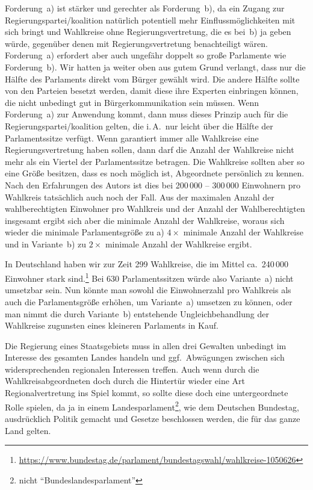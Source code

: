 Forderung~a) ist stärker und gerechter als Forderung~b), da ein Zugang zur
Regierungspartei/koalition natürlich potentiell mehr Einflussmöglichkeiten mit sich bringt und
Wahlkreise ohne Regierungsvertretung, die es bei~b) ja geben würde, gegenüber denen mit
Regierungsvertretung benachteiligt wären. Forderung~a) erfordert aber auch ungefähr doppelt so
große Parlamente wie Forderung~b).
Wir hatten ja weiter oben aus gutem Grund verlangt, dass nur die Hälfte des Parlaments direkt
vom Bürger gewählt wird. Die andere Hälfte sollte von den Parteien besetzt werden, damit diese
ihre Experten einbringen können, die nicht unbedingt gut in Bürgerkommunikation sein müssen. Wenn
Forderung~a) zur Anwendung kommt, dann muss dieses Prinzip auch für die Regierungspartei/koalition
gelten, die i.\,A.\ nur leicht über die Hälfte der Parlamentssitze verfügt. Wenn garantiert immer
alle Wahlkreise eine Regierungsvertretung haben sollen, dann darf die Anzahl der Wahlkreise nicht
mehr als ein Viertel der Parlamentssitze betragen. Die Wahlkreise sollten aber so eine Größe
besitzen, dass es noch möglich ist, Abgeordnete persönlich zu kennen. Nach den Erfahrungen des
Autors ist dies bei 200\,000 -- 300\,000 Einwohnern pro Wahlkreis tatsächlich auch noch der Fall.
Aus der maximalen Anzahl der wahlberechtigten Einwohner pro Wahlkreis und der Anzahl der
Wahlberechtigten insgesamt ergibt sich aber die minimale Anzahl der Wahlkreise, woraus sich
wieder die minimale Parlamentsgröße zu a) $4\times$ minimale Anzahl der Wahlkreise und in
Variante~b) zu $2\times$ minimale Anzahl der Wahlkreise ergibt.

In Deutschland haben wir zur Zeit 299 Wahlkreise, die im Mittel ca.\ 240\,000 Einwohner stark
sind.\footnote{\url{https://www.bundestag.de/parlament/bundestagswahl/wahlkreise-1050626}} Bei
630 Parlamentssitzen würde also Variante~a) nicht umsetzbar sein. Nun könnte man sowohl die
Einwohnerzahl pro Wahlkreis als auch die Parlamentsgröße erhöhen, um Variante~a) umsetzen zu
können, oder man nimmt die durch Variante~b) entstehende Ungleichbehandlung der Wahlkreise
zugunsten eines kleineren Parlaments in Kauf.

Die Regierung eines Staatsgebiets muss in allen drei Gewalten unbedingt im Interesse des gesamten
Landes handeln und ggf.\ Abwägungen zwischen sich widersprechenden regionalen Interessen treffen.
Auch wenn durch die Wahlkreisabgeordneten doch durch die Hintertür wieder eine Art
Regionalvertretung ins Spiel kommt, so sollte diese doch eine untergeordnete Rolle spielen, da ja
in einem Landesparlament\footnote{nicht \enquote{Bundeslandesparlament}}, wie dem Deutschen
Bundestag, ausdrücklich Politik gemacht und Gesetze beschlossen werden, die für das ganze Land
gelten.

